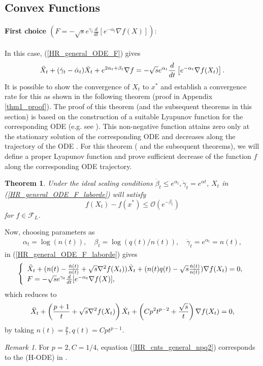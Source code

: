 \documentclass{article}
\theoremstyle{plain}
\newtheorem{theorem}{Theorem}[section]
\theoremstyle{definition}
\theoremstyle{remark}
\newtheorem{remark}{Remark}[theorem]
\begin{document}
\subsection{Convex Functions}
\paragraph{First choice $( {F = -\sqrt{s}e^{\gamma_t}\frac{d}{dt}[e^{-\alpha_t}\nabla f(X)]}):$} 
    In this case, (\ref{HR_general_ODE_F}) gives
    \begin{align}\label{HR_general_ODE_F_laborde}
    \Ddot{X}_t + (\dot{\gamma}_t-\dot{\alpha}_t)\dot{X}_t+e^{2\alpha_t+\beta_t}\nabla f = -\sqrt{s}e^{\alpha_t}\frac{d}{dt}\left[e^{-\alpha_t}\nabla f(X_t)\right].
\end{align}
It is possible to show the convergence of \(X_t\) to \(x^*\) and establish a convergence rate for this as shown in the following theorem (proof in Appendix \ref{thm1_proof}). The proof of this theorem (and the subsequent theorems in this section) is based on the construction of a suitable Lyapunov function for the corresponding ODE (e.g. see \citep{siegel2019accelerated,shi2019acceleration,attouch2020first,attouch2021convergence}). This non-negative function attains zero only at the stationary solution of the corresponding ODE and decreases along the trajectory of the ODE \citep{khalil2002nonlinear}. For this theorem ( and the subsequent theorems), we will define a proper Lyapunov function and prove sufficient decrease of the function \(f\) along the corresponding ODE trajectory.
\begin{theorem}\label{Theorem_ODE_laborde}
Under the ideal scaling conditions $\dot\beta_t\leq e^{\alpha_t}, \dot\gamma_t=e^{\alpha t}$, \(X_t\) in (\ref{HR_general_ODE_F_laborde}) will satisfy 
$$f(X_t)-f(x^*)\leq \mathcal{O}(e^{-\beta_t})$$
for $f\in \mathcal{F}_L$.
\end{theorem}

Now, choosing parameters as
\begin{align}\label{prams_general}
        \alpha_t=\log (n(t)),\quad
    \beta_t=\log (q(t)/n(t)),\quad
    \dot\gamma_t=e^{\alpha_t}=n(t),
\end{align}
in (\ref{HR_general_ODE_F_laborde}) gives
\begin{align}\label{HR_cnts_general_npq_laborde}
\left\{
\begin{array}{l}
     \Ddot{X}_t + (n(t)-\frac{\dot n(t)}{n(t)}+\sqrt{s}\nabla^2 f(X_t))\dot{X}_t+(n(t)q(t)-\sqrt{s} \frac{\dot n(t)}{n(t)})\nabla f(X_t)=0,   \\
    F = -\sqrt{s}e^{\gamma_t}\frac{d}{dt}[e^{-\alpha_t}\nabla f(X)],  
\end{array}\right.
\end{align}
which reduces to 
\begin{align}\label{HR_cnts_general_npq2}
     \Ddot{X}_t + \left(\frac{p+1}{t}+\sqrt{s}\nabla^2 f(X_t)\right)\dot{X}_t+\left(Cp^2t^{p-2}+\frac{\sqrt{s}}{t}\right)\nabla f(X_t)=0,
\end{align}
by taking $n(t)=\frac{p}{t},q(t)=Cpt^{p-1}$. 
\begin{remark}
For \(p=2,C=1/4\), equation (\ref{HR_cnts_general_npq2}) corresponds to the (H-ODE) in \citep{pmlr-v108-laborde20a}.
\end{remark}
\end{document}
